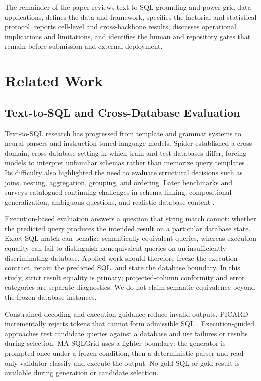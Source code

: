 \documentclass[applsci,article,submit,moreauthors]{Definitions/mdpi}
\newcommand{\masql}{MA-SQLGrid}
\begin{document}
The remainder of the paper reviews text-to-SQL grounding and power-grid data applications, defines the data and framework, specifies the factorial and statistical protocol, reports cell-level and cross-backbone results, discusses operational implications and limitations, and identifies the human and repository gates that remain before submission and external deployment.

\section{Related Work}
\subsection{Text-to-SQL and Cross-Database Evaluation}
Text-to-SQL research has progressed from template and grammar systems to neural parsers and instruction-tuned language models. Spider established a cross-domain, cross-database setting in which train and test databases differ, forcing models to interpret unfamiliar schemas rather than memorize query templates \cite{yu2018spider}. Its difficulty also highlighted the need to evaluate structural decisions such as joins, nesting, aggregation, grouping, and ordering. Later benchmarks and surveys catalogued continuing challenges in schema linking, compositional generalization, ambiguous questions, and realistic database content \cite{katsogiannis2023survey,lee2021kaggledbqa,li2023bird}.

Execution-based evaluation answers a question that string match cannot: whether the predicted query produces the intended result on a particular database state. Exact SQL match can penalize semantically equivalent queries, whereas execution equality can fail to distinguish nonequivalent queries on an insufficiently discriminating database. Applied work should therefore freeze the execution contract, retain the predicted SQL, and state the database boundary. In this study, strict result equality is primary; projected-column conformity and error categories are separate diagnostics. We do not claim semantic equivalence beyond the frozen database instances.

Constrained decoding and execution guidance reduce invalid outputs. PICARD incrementally rejects tokens that cannot form admissible SQL \cite{scholak2021picard}. Execution-guided approaches test candidate queries against a database and use failures or results during selection. \masql{} uses a lighter boundary: the generator is prompted once under a frozen condition, then a deterministic parser and read-only validator classify and execute the output. No gold SQL or gold result is available during generation or candidate selection.
\end{document}
